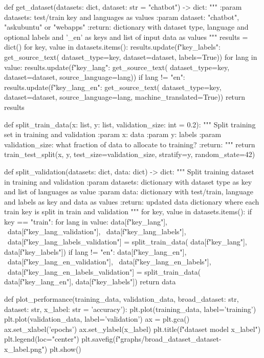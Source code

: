 \begin{python}
def get_dataset(datasets: dict, dataset: str = "chatbot") -> dict:
  """
  :param datasets: test/train key and languages as values
  :param dataset: "chatbot", "askubuntu" or "webapps"
  :return: dictionary with dataset type, language and optional
     labels and '_en' as keys and list of input data as values
  """
  results = dict()
  for key, value in datasets.items():
    results.update({f"{key}_labels": get_source_text(
      dataset_type=key, dataset=dataset, labels=True)})
    for lang in value:
      results.update({f"{key}_{lang}": get_source_text(
        dataset_type=key, dataset=dataset, source_language=lang)})
      if lang != "en":
        results.update({f"{key}_{lang}_en": get_source_text(
          dataset_type=key, dataset=dataset,
          source_language=lang, machine_translated=True)})
  return results


def split_train_data(x: list, y: list, validation_size: int = 0.2):
  """ Split training set in training and validation
  :param x: data
  :param y: labels
  :param validation_size: what fraction of data to allocate to training?
  :return:
  """
  return train_test_split(x, y, test_size=validation_size, stratify=y,
                          random_state=42)


def split_validation(datasets: dict, data: dict) -> dict:
  """ Split training dataset in training and validation
  :param datasets: dictionary with dataset type as key and list of languages as value
  :param data: dictionary with test/train, language and labels as key and data as values
  :return: updated data dictionary where each train key is split in train and validation
  """
  for key, value in datasets.items():
    if key == "train":
      for lang in value:
        data[f"{key}_{lang}"], \
          data[f"{key}_{lang}_validation"], \
          data[f"{key}_{lang}_labels"], \
          data[f"{key}_{lang}_labels_validation"] = split_train_data(
          data[f"{key}_{lang}"],
          data[f"{key}_labels"])
        if lang != "en":
          data[f"{key}_{lang}_en"], \
            data[f"{key}_{lang}_en_validation"], \
            data[f"{key}_{lang}_en_labels"], \
            data[f"{key}_{lang}_en_labels_validation"] = split_train_data(
            data[f"{key}_{lang}_en"],
            data[f"{key}_labels"])
  return data


def plot_performance(training_data, validation_data, broad_dataset: str,
                     dataset: str, x_label: str = 'accuracy'):
  plt.plot(training_data, label='training')
  plt.plot(validation_data, label='validation')
  ax = plt.gca()
  ax.set_xlabel('epochs')
  ax.set_ylabel(x_label)
  plt.title(f"{dataset} model {x_label}")
  plt.legend(loc="center")
  plt.savefig(f"graphs/{broad_dataset}_{dataset}-{x_label}.png")
  plt.show()



\end{python}
